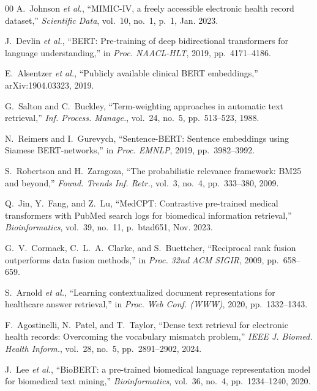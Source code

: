 \documentclass[conference]{IEEEtran}
\begin{document}
\begin{thebibliography}{00}
A.~Johnson \textit{et al.}, ``MIMIC-IV, a freely accessible electronic health record dataset,'' \textit{Scientific Data}, vol.~10, no.~1, p.~1, Jan. 2023.

J.~Devlin \textit{et al.}, ``BERT: Pre-training of deep bidirectional transformers for language understanding,'' in \textit{Proc. NAACL-HLT}, 2019, pp.~4171--4186.

E.~Alsentzer \textit{et al.}, ``Publicly available clinical BERT embeddings,'' arXiv:1904.03323, 2019.

G.~Salton and C.~Buckley, ``Term-weighting approaches in automatic text retrieval,'' \textit{Inf. Process. Manage.}, vol.~24, no.~5, pp.~513--523, 1988.

N.~Reimers and I.~Gurevych, ``Sentence-BERT: Sentence embeddings using Siamese BERT-networks,'' in \textit{Proc. EMNLP}, 2019, pp.~3982--3992.

S.~Robertson and H.~Zaragoza, ``The probabilistic relevance framework: BM25 and beyond,'' \textit{Found. Trends Inf. Retr.}, vol.~3, no.~4, pp.~333--380, 2009.

Q.~Jin, Y.~Fang, and Z.~Lu, ``MedCPT: Contrastive pre-trained medical transformers with PubMed search logs for biomedical information retrieval,'' \textit{Bioinformatics}, vol.~39, no.~11, p.~btad651, Nov. 2023.

G.~V.~Cormack, C.~L.~A.~Clarke, and S.~Buettcher, ``Reciprocal rank fusion outperforms data fusion methods,'' in \textit{Proc. 32nd ACM SIGIR}, 2009, pp.~658--659.

S.~Arnold \textit{et al.}, ``Learning contextualized document representations for healthcare answer retrieval,'' in \textit{Proc. Web Conf. (WWW)}, 2020, pp.~1332--1343.

F.~Agostinelli, N.~Patel, and T.~Taylor, ``Dense text retrieval for electronic health records: Overcoming the vocabulary mismatch problem,'' \textit{IEEE J. Biomed. Health Inform.}, vol.~28, no.~5, pp.~2891--2902, 2024.

J.~Lee \textit{et al.}, ``BioBERT: a pre-trained biomedical language representation model for biomedical text mining,'' \textit{Bioinformatics}, vol.~36, no.~4, pp.~1234--1240, 2020.


\end{thebibliography}
\end{document}
